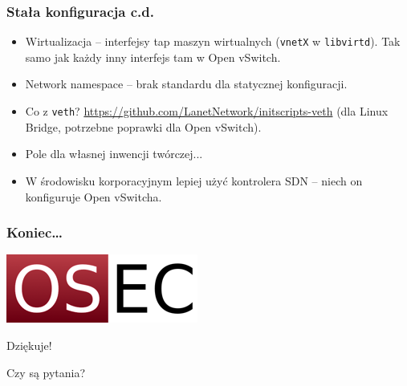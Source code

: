 \documentclass[dvipsnames,table]{beamer}
\begin{document}
\begin{frame}[fragile]
\frametitle{Stała konfiguracja c.d.}
\begin{itemize}
	\item Wirtualizacja -- interfejsy tap maszyn wirtualnych ({\tt vnetX} w {\tt libvirtd}). Tak samo jak każdy inny interfejs tam w Open vSwitch.
	\item Network namespace -- brak standardu dla statycznej konfiguracji. 
	\item Co z {\tt veth}? \href{https://github.com/LanetNetwork/initscripts-veth}{https://github.com/LanetNetwork/initscripts-veth} (dla Linux Bridge, potrzebne poprawki dla Open vSwitch).
	\item Pole dla własnej inwencji twórczej...
	\item W środowisku korporacyjnym lepiej użyć kontrolera SDN -- niech on konfiguruje Open vSwitcha.
\end{itemize}
\end{frame}

\begin{frame}
\frametitle{Koniec\ldots}
\begin{center}
\includegraphics[scale=0.5]{img-oseclogo.png}

Dziękuje!

Czy są pytania?

\end{center}
\end{frame}
\end{document}
